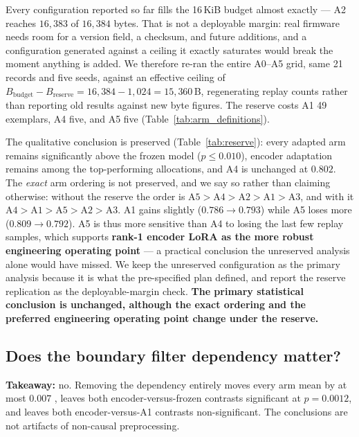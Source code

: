 Every configuration reported so far fills the 16\,KiB budget almost exactly ---
A2 reaches $16{,}383$ of $16{,}384$ bytes. That is not a deployable margin: real
firmware needs room for a version field, a checksum, and future additions, and a
configuration generated against a ceiling it exactly saturates would break the
moment anything is added. We therefore re-ran the entire A0--A5 grid, same 21
records and five seeds, against an effective ceiling of
$B_{\mathrm{budget}} - B_{\mathrm{reserve}} = 16{,}384 - 1{,}024 = 15{,}360$\,B,
regenerating replay counts rather than reporting old results against new byte
figures. The reserve costs A1 49 exemplars, A4 five, and A5 five
(Table~\ref{tab:arm_definitions}).

The qualitative conclusion is preserved (Table~\ref{tab:reserve}): every adapted
arm remains significantly above the frozen model ($p \le 0.010$), encoder
adaptation remains among the top-performing allocations, and A4 is unchanged at
$0.802$. The \emph{exact} arm ordering is not preserved, and we say so rather
than claiming otherwise: without the reserve the order is
$\mathrm{A5} > \mathrm{A4} > \mathrm{A2} > \mathrm{A1} > \mathrm{A3}$, and with it
$\mathrm{A4} > \mathrm{A1} > \mathrm{A5} > \mathrm{A2} > \mathrm{A3}$. A1 gains
slightly ($0.786 \to 0.793$) while A5 loses more ($0.809 \to 0.792$). A5 is thus
more sensitive than A4 to losing the last few replay samples, which supports
\textbf{rank-1 encoder LoRA as the more robust engineering operating point} --- a
practical conclusion the unreserved analysis alone would have missed. We keep the unreserved configuration as the primary analysis because it
is what the pre-specified plan defined, and report the reserve replication as the
deployable-margin check. \textbf{The primary statistical conclusion is
unchanged, although the exact ordering and the preferred engineering operating
point change under the reserve.}



\subsection{Does the boundary filter dependency matter?}
\label{sec:splitfirst}

\textbf{Takeaway:} no. Removing the dependency entirely moves every arm mean by
at most $0.007$ \macrof{}, leaves both encoder-versus-frozen contrasts
significant at $p = 0.0012$, and leaves both encoder-versus-A1 contrasts
non-significant. The conclusions are not artifacts of non-causal preprocessing.

